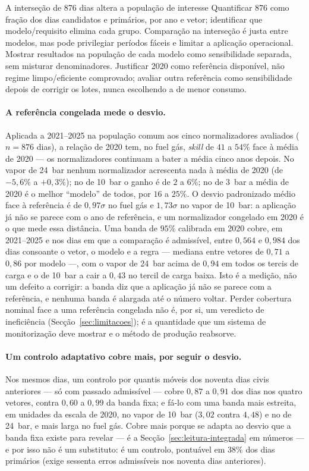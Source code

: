 {A interseção de 876 dias altera a população de interesse}
{Quantificar 876 como fração dos dias candidatos e primários, por ano
e vetor; identificar que modelo/requisito elimina cada grupo.
Comparação na interseção é justa entre modelos, mas pode privilegiar
períodos fáceis e limitar a aplicação operacional. Mostrar resultados
na população de cada modelo como sensibilidade separada, sem misturar
denominadores. Justificar 2020 como referência disponível, não regime
limpo/eficiente comprovado; avaliar outra referência como sensibilidade
depois de corrigir os lotes, nunca escolhendo a de menor consumo.}%
\paragraph{A referência congelada mede o desvio.} Aplicada a 2021--2025 na
população comum aos cinco normalizadores avaliados ($n = 876$ dias), a
relação de 2020 tem, no fuel gás, \emph{skill} de $41$ a $54\%$ face à média
de 2020 --- os normalizadores continuam a bater a média cinco anos depois.
No vapor de 24~bar nenhum normalizador acrescenta nada à média de 2020 (de
$-5{,}6\%$ a $+0{,}3\%$); no de 10~bar o ganho é de $2$ a $6\%$; no de
3~bar a média de 2020 é o melhor ``modelo'' de todos, por $16$ a $25\%$. O
desvio padronizado médio face à referência é de $0{,}97\sigma$ no fuel gás
e $1{,}73\sigma$ no vapor de 10~bar: a aplicação já não se parece com o ano
de referência, e um normalizador congelado em 2020 é o que mede essa
distância. Uma banda de $95\%$ calibrada em 2020 cobre, em 2021--2025 e nos
dias em que a comparação é admissível, entre $0{,}564$ e $0{,}984$ dos dias
consoante o vetor, o modelo e a regra --- mediana entre vetores de
$0{,}71$ a $0{,}86$ por modelo ---, com o vapor de 24~bar acima de $0{,}94$
em todos os tercis de carga e o de 10~bar a cair a $0{,}43$ no tercil de
carga baixa. Isto é a medição, não um defeito a corrigir: a banda diz que a
aplicação já não se parece com a referência, e nenhuma banda é alargada até
o número voltar. Perder cobertura nominal face a uma referência congelada
não é, por si, um veredicto de ineficiência (Secção~\ref{sec:limitacoes});
é a quantidade que um sistema de monitorização deve mostrar e o método de
produção reabsorve.

\paragraph{Um controlo adaptativo cobre mais, por seguir o desvio.} Nos
mesmos dias, um controlo por quantis móveis dos noventa dias civis
anteriores --- só com passado admissível --- cobre $0{,}87$ a $0{,}91$ dos
dias nos quatro vetores, contra $0{,}60$ a $0{,}99$ da banda fixa; e fá-lo
com uma banda mais estreita, em unidades da escala de 2020, no vapor de
10~bar ($3{,}02$ contra $4{,}48$) e no de 24~bar, e mais larga no fuel gás.
Cobre mais porque se adapta ao desvio que a banda fixa existe para revelar
--- é a Secção~\ref{sec:leitura-integrada} em números --- e por isso não é
um substituto: é um controlo, pontuável em $38\%$ dos dias primários
(exige sessenta erros admissíveis nos noventa dias anteriores).

